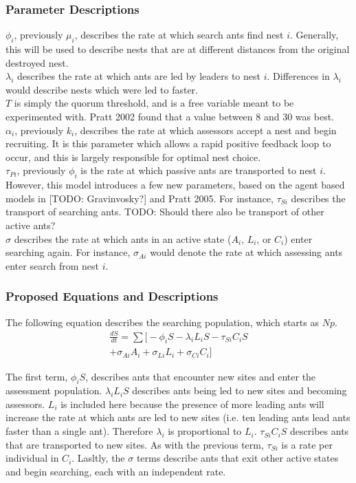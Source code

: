 \documentclass[letterpaper]{article}
\begin{document}
\subsubsection{Parameter Descriptions} 

$\phi_i$, previously $\mu_i$, describes the rate at which search ants find nest $i$. 
Generally, this will be used to describe nests that are at different distances from the original destroyed nest. \\
$\lambda_i$ describes the rate at which ants are led by leaders to nest $i$. 
Differences in $\lambda_i$ would describe nests which were led to faster. \\
$T$ is simply the quorum threshold, and is a free variable meant to be experimented with.
Pratt 2002 found that a value between $8$ and $30$ was best. \\
$\alpha_i$, previously $k_i$, describes the rate at which assessors accept a nest and begin recruiting.
It is this parameter which allows a rapid positive feedback loop to occur, and this is largely responsible for optimal nest choice. \\
$\tau_{Pi}$, previously $\phi_i$ is the rate at which passive ants are transported to nest $i$.
However, this model introduces a few new parameters, based on the agent based models in [TODO: Gravinvosky?] and Pratt 2005. 
For instance, $\tau_{Si}$ describes the transport of searching ants. 
TODO: Should there also be transport of other active ants? \\
$\sigma$ describes the rate at which ants in an active state ($A_i$, $L_i$, or $C_i$) enter searching again.
For instance, $\sigma_{Ai}$ would denote the rate at which assessing ants enter search from nest $i$.

\subsubsection{Proposed Equations and Descriptions}

The following equation describes the searching population, which starts as $Np$.
\begin{multline}
    \frac{dS}{dt} = \sum \big[ -\phi_iS - \lambda_iL_iS - \tau_{Si}C_iS \\ + \sigma_{Ai}A_i + \sigma_{Li}L_i + \sigma_{Ci}C_i \big]
\end{multline}

The first term, $\phi_iS$, describes ants that encounter new sites and enter the assessment population.
$\lambda_iL_iS$ describes ants being led to new sites and becoming assessors. $L_i$ is included here because the presence of more leading ants will increase the rate at which ants are led to new sites (i.e. ten leading ants lead ants faster than a single ant). Therefore $\lambda_i$ is proportional to $L_i$.
$\tau_{Si}C_iS$ describes ants that are transported to new sites. As with the previous term, $\tau_{Si}$ is a rate per individual in $C_i$.
Lasltly, the $\sigma$ terms describe ants that exit other active states and begin searching, each with an independent rate.
\end{document}
